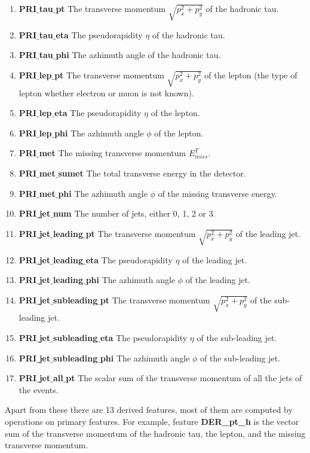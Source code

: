\documentclass[final,3p,times,twocolumn]{elsarticle}
\begin{document}
\begin{enumerate}[noitemsep]
\item{\textbf{PRI$\_$tau$\_$pt} The transverse momentum $\sqrt{p_{x}^2 + p_{y}^2}$ of the hadronic tau.}
\item{\textbf{PRI$\_$tau$\_$eta} The pseudorapidity $\eta$ of the hadronic tau.}
\item{\textbf{PRI$\_$tau$\_$phi} The azhimuth angle of the hadronic tau.}
\item{\textbf{PRI$\_$lep$\_$pt} The transverse momentum $\sqrt{p_{x}^2 + p_{y}^2}$ of the lepton (the type of lepton whether electron or muon is not known).}
\item{\textbf{PRI$\_$lep$\_$eta} The pseudorapidity $\eta$ of the lepton.}
\item{\textbf{PRI$\_$lep$\_$phi} The azhimuth angle $\phi$ of the lepton.}
\item{\textbf{PRI$\_$met} The missing transverse momentum $E_{miss}^{T}$.}
\item{\textbf{PRI$\_$met$\_$sumet} The total transverse energy in the detector.}
\item{\textbf{PRI$\_$met$\_$phi} The azhimuth angle $\phi$ of the missing transverse energy.}
\item{\textbf{PRI$\_$jet$\_$num} The number of jets, either 0, 1, 2 or 3.}
\item{\textbf{PRI$\_$jet$\_$leading$\_$pt} The transverse momentum $\sqrt{p_{x}^2 + p_{y}^2}$ of the leading jet.}
\item{\textbf{PRI$\_$jet$\_$leading$\_$eta} The pseudorapidity $\eta$ of the leading jet.}
\item{\textbf{PRI$\_$jet$\_$leading$\_$phi} The azhimuth angle $\phi$ of the leading jet.}
\item{\textbf{PRI$\_$jet$\_$subleading$\_$pt} The transverse momentum $\sqrt{p_{x}^2 + p_{y}^2}$ of the sub-leading jet.}
\item{\textbf{PRI$\_$jet$\_$subleading$\_$eta} The pseudorapidity $\eta$ of the sub-leading jet.}
\item{\textbf{PRI$\_$jet$\_$subleading$\_$phi} The azhimuth angle $\phi$ of the sub-leading jet.}
\item{\textbf{PRI$\_$jet$\_$all$\_$pt} The scalar sum of the transverse momentum of all the jets of the events.}
\end{enumerate}

Apart from these there are 13 derived features, most of them are computed by operations on primary features. For example, feature \textbf{DER\_pt\_h} is the vector sum of the transverse momentum of the hadronic tau, the lepton, and the missing transverse momentum. 
  
\end{document}

